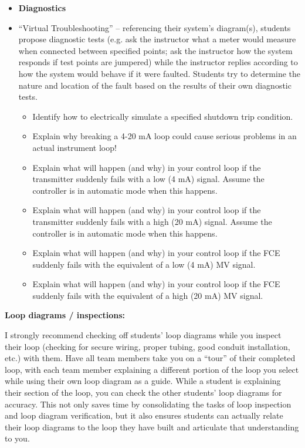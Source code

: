 \begin{itemize}
\item{} {\bf Diagnostics}
\item{} ``Virtual Troubleshooting'' -- referencing their system's diagram(s), students propose diagnostic tests (e.g. ask the instructor what a meter would measure when connected between specified points; ask the instructor how the system responds if test points are jumpered) while the instructor replies according to how the system would behave if it were faulted.  Students try to determine the nature and location of the fault based on the results of their own diagnostic tests.
\begin{itemize}

\item{} Identify how to electrically simulate a specified shutdown trip condition.
\item{} Explain why breaking a 4-20 mA loop could cause serious problems in an actual instrument loop!
\item{} Explain what will happen (and why) in your control loop if the transmitter suddenly fails with a low (4 mA) signal.  Assume the controller is in automatic mode when this happens.
\item{} Explain what will happen (and why) in your control loop if the transmitter suddenly fails with a high (20 mA) signal.  Assume the controller is in automatic mode when this happens.
\item{} Explain what will happen (and why) in your control loop if the FCE suddenly fails with the equivalent of a low (4 mA) MV signal.
\item{} Explain what will happen (and why) in your control loop if the FCE suddenly fails with the equivalent of a high (20 mA) MV signal.
\end{itemize}
\end{itemize}















\noindent
{\bf Loop diagrams / inspections:}

I strongly recommend checking off students' loop diagrams while you inspect their loop (checking for secure wiring, proper tubing, good conduit installation, etc.) with them.  Have all team members take you on a ``tour'' of their completed loop, with each team member explaining a different portion of the loop you select while using their own loop diagram as a guide.  While a student is explaining their section of the loop, you can check the other students' loop diagrams for accuracy.  This not only saves time by consolidating the tasks of loop inspection and loop diagram verification, but it also ensures students can actually relate their loop diagrams to the loop they have built and articulate that understanding to you.




